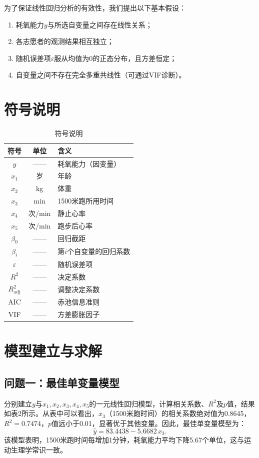 \documentclass[12pt,a4paper]{article}
\begin{document}
为了保证线性回归分析的有效性，我们提出以下基本假设：
\begin{enumerate}[label=(\alph*)]
\item 耗氧能力$y$与所选自变量之间存在线性关系；
\item 各志愿者的观测结果相互独立；
\item 随机误差项$\varepsilon$服从均值为0的正态分布，且方差恒定；
\item 自变量之间不存在完全多重共线性（可通过VIF诊断）。
\end{enumerate}

\section{符号说明}

\begin{table}[H]
\centering
\caption{符号说明}
\label{tab:notation}
\begin{tabular}{ccl}
\toprule
符号 & 单位 & 含义 \\
\midrule
$y$ & —— & 耗氧能力（因变量） \\
$x_1$ & 岁 & 年龄 \\
$x_2$ & kg & 体重 \\
$x_3$ & min & 1500米跑所用时间 \\
$x_4$ & 次/min & 静止心率 \\
$x_5$ & 次/min & 跑步后心率 \\
$\beta_0$ & —— & 回归截距 \\
$\beta_i$ & —— & 第$i$个自变量的回归系数 \\
$\varepsilon$ & —— & 随机误差项 \\
$R^2$ & —— & 决定系数 \\
$R^2_{\text{adj}}$ & —— & 调整决定系数 \\
AIC & —— & 赤池信息准则 \\
VIF & —— & 方差膨胀因子 \\
\bottomrule
\end{tabular}
\end{table}

\section{模型建立与求解}

\subsection{问题一：最佳单变量模型}

分别建立$y$与$x_1,x_2,x_3,x_4,x_5$的一元线性回归模型，计算相关系数、$R^2$及$p$值，结果如表2所示。从表中可以看出，$x_3$（1500米跑时间）的相关系数绝对值为0.8645，$R^2=0.7474$，$p$值远小于0.01，显著优于其他变量。因此，最佳单变量模型为：
\[
\hat{y}=83.4438-5.6682\,x_3.
\]
该模型表明，1500米跑时间每增加1分钟，耗氧能力平均下降5.67个单位，这与运动生理学常识一致。
\end{document}
